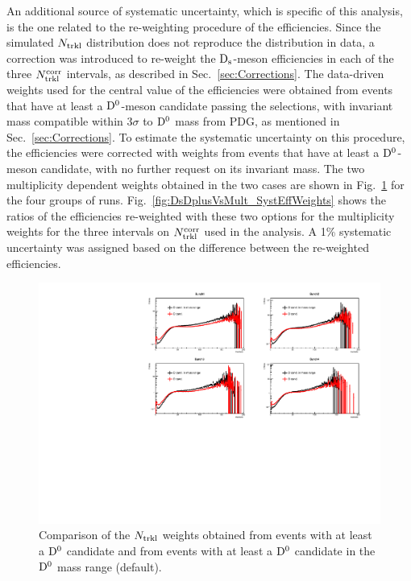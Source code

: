 An additional source of systematic uncertainty, which is specific of this analysis, is the one related to 
the re-weighting procedure of the efficiencies.  
Since the simulated $N_{\rm trkl}$ distribution does not reproduce the distribution in data, 
a correction was introduced to re-weight the ${\rm D_s}$-meson efficiencies in each of the three $N_{\rm trkl}^{\rm corr}$ intervals, as described 
in Sec.~\ref{sec:Corrections}. 
The data-driven weights used for the central value of the efficiencies were obtained from
events that have at least a ${\rm D^0}$-meson candidate
passing the selections, with invariant mass compatible within 3$\sigma$ to ${\rm D^0}$ mass from PDG, as mentioned 
in Sec.~\ref{sec:Corrections}.
To estimate the systematic uncertainty on this procedure,
the efficiencies were corrected with weights from events that have at 
least a ${\rm D^0}$-meson candidate, with no further request on its invariant mass. 
The two multiplicity dependent weights obtained in the two cases are shown in 
Fig.~\ref{fig:NtrklWeights_EvWithD_EvWithCand_Comparison} for the four groups of runs. 
Fig.~\ref{fig:DsDplusVsMult_SystEffWeights} shows the ratios of the efficiencies re-weighted 
with these two options for the multiplicity weights for the three intervals on $N_{\rm trkl}^{\rm corr}$ used
in the analysis. A 1\% systematic uncertainty was assigned based on the difference between 
the re-weighted efficiencies.\\

\begin{figure}[htpb]
\centering
 \includegraphics[width=.9\textwidth]{FigCap6/NtrkWeightsD-Cand_4Bunches_DsDplusVsmult.pdf}
 \caption{Comparison of the $N_{\rm trkl}$ weights obtained from events with at least a ${\rm D^0}$ candidate and from events with at least a ${\rm D^0}$ candidate in the ${\rm D^0}$ mass range (default).}
 \label{fig:NtrklWeights_EvWithD_EvWithCand_Comparison}
\end{figure}


